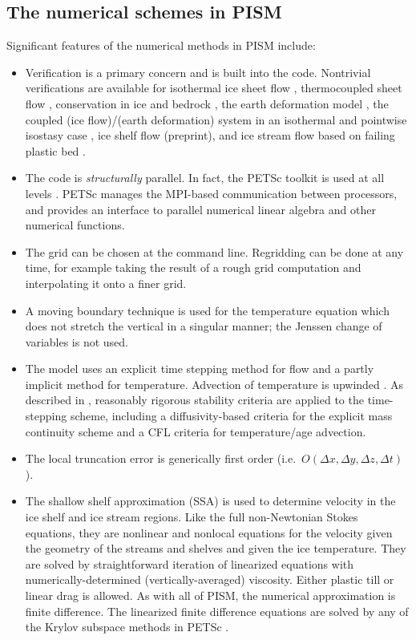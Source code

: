 \documentclass[11pt,final]{amsart}
\begin{document}
\subsection{The numerical schemes in PISM}  Significant features of the numerical methods in PISM include:\begin{itemize}
\item Verification \cite{Roache} is a primary concern and is built into the code.  Nontrivial verifications are available for isothermal ice sheet flow \cite{BLKCB}, thermocoupled sheet flow \cite{BB,BBL}, conservation in ice and bedrock \cite{BuelerTestK}, the earth deformation model \cite{BLKfastearth}, the coupled (ice flow)/(earth deformation) system in an isothermal and pointwise isostasy  case \cite{BLKfastearth}, ice shelf flow (preprint), and ice stream flow based on failing plastic bed \cite{SchoofStream}.
\item The code is \emph{structurally} parallel.  In fact, the PETSc toolkit is used at all levels \cite{petsc-user-ref}.  PETSc manages the MPI-based communication between processors, and provides an interface to parallel numerical linear algebra and other numerical functions.
\item The grid can be chosen at the command line.  Regridding can be done at any time, for example taking the result of a rough grid computation and interpolating it onto a finer grid.
\item A moving boundary technique is used for the temperature equation which does not stretch the vertical in a singular manner; the Jenssen \cite{Jenssen} change of variables is not used.
\item The model uses an explicit time stepping method for flow and a partly implicit method for temperature.  Advection of temperature is upwinded \cite{MortonMayers}.  As described  in  \cite{BBL}, reasonably rigorous stability criteria are applied to the time-stepping scheme, including a diffusivity-based criteria for the explicit mass continuity scheme and a CFL criteria \cite{MortonMayers} for temperature/age advection.
\item The local truncation error is generically first order (i.e.~$O(\Delta x,\Delta y,\Delta z,\Delta t)$).
\item The shallow shelf approximation (SSA) \cite{WeisGreveHutter} is used to determine velocity in the ice shelf and ice stream regions.  Like the full non-Newtonian Stokes equations, they are nonlinear and nonlocal equations for the velocity given the geometry of the streams and shelves and given the ice temperature.  They are solved by straightforward iteration of linearized equations with numerically-determined (vertically-averaged) viscosity.  Either plastic till or linear drag is allowed.  As with all of PISM, the numerical approximation is finite difference.  The linearized finite difference equations are solved by any of the Krylov subspace methods in PETSc \cite{petsc-user-ref}.

\end{itemize}
\end{document}
